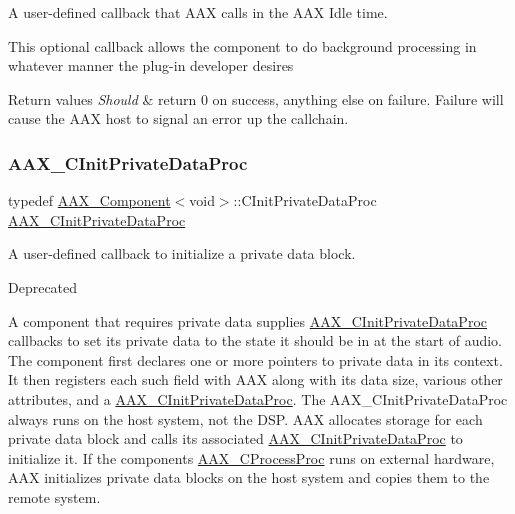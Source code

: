A user-\/defined callback that A\+AX calls in the A\+AX Idle time. 

This optional callback allows the component to do background processing in whatever manner the plug-\/in developer desires


\begin{DoxyRetVals}{Return values}
{\em Should} & return 0 on success, anything else on failure. Failure will cause the A\+AX host to signal an error up the callchain. \\
\hline
\end{DoxyRetVals}
\mbox{\label{a00401_adfb5d89b9d957c541fc98fe42bc050c4}} 
\subsubsection{\texorpdfstring{AAX\_CInitPrivateDataProc}{AAX\_CInitPrivateDataProc}}
{\footnotesize\ttfamily typedef \mbox{\hyperlink{a01437}{A\+A\+X\+\_\+\+Component}}$<$void$>$\+::C\+Init\+Private\+Data\+Proc \mbox{\hyperlink{a00401_adfb5d89b9d957c541fc98fe42bc050c4}{A\+A\+X\+\_\+\+C\+Init\+Private\+Data\+Proc}}}



A user-\/defined callback to initialize a private data block. 

\begin{DoxyRefDesc}{Deprecated}
\item[\mbox{\hyperlink{a00788__deprecated000003}{Deprecated}}]\end{DoxyRefDesc}


A component that requires private data supplies \mbox{\hyperlink{a00401_adfb5d89b9d957c541fc98fe42bc050c4}{A\+A\+X\+\_\+\+C\+Init\+Private\+Data\+Proc}} callbacks to set its private data to the state it should be in at the start of audio. The component first declares one or more pointers to private data in its context. It then registers each such field with A\+AX along with its data size, various other attributes, and a \mbox{\hyperlink{a00401_adfb5d89b9d957c541fc98fe42bc050c4}{A\+A\+X\+\_\+\+C\+Init\+Private\+Data\+Proc}}. The A\+A\+X\+\_\+\+C\+Init\+Private\+Data\+Proc always runs on the host system, not the D\+SP. A\+AX allocates storage for each private data block and calls its associated \mbox{\hyperlink{a00401_adfb5d89b9d957c541fc98fe42bc050c4}{A\+A\+X\+\_\+\+C\+Init\+Private\+Data\+Proc}} to initialize it. If the component\textquotesingle{}s \mbox{\hyperlink{a00401_ad6dd5e1aa5bd2f8462966685e3b26a6e}{A\+A\+X\+\_\+\+C\+Process\+Proc}} runs on external hardware, A\+AX initializes private data blocks on the host system and copies them to the remote system.


